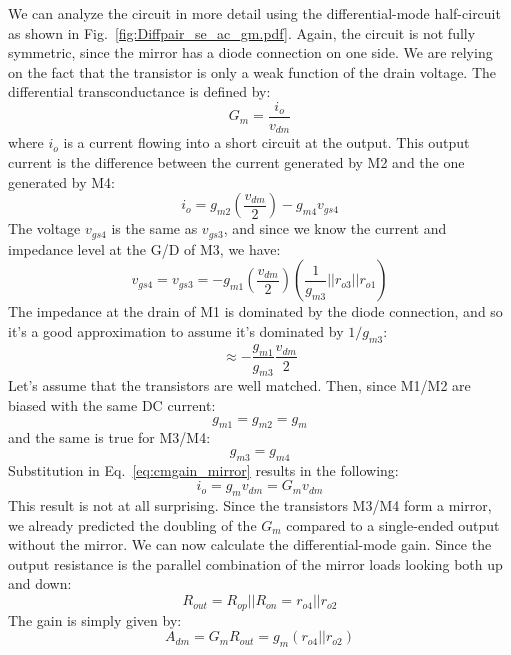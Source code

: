 We can analyze the circuit in more detail using the differential-mode half-circuit as shown in Fig.~\ref{fig:Diffpair_se_ac_gm.pdf}.  Again, the circuit is not fully symmetric, since the mirror has a diode connection on one side.  We are relying on the fact that the transistor is only a weak function of the drain voltage.  The differential transconductance is defined by:
\begin{equation}
	{G_m} = \frac{{{i_o}}}{{{v_{dm}}}}
\end{equation}
where $i_o$ is a current flowing into a short circuit at the output.  This output current is the difference between the current generated by M2 and the one generated by M4:
\begin{equation}
	{i_o} = {g_{m2}}\left( {\frac{{{v_{dm}}}}{2}} \right) - {g_{m4}}{v_{gs4}}
	\label{eq:cmgain_mirror}
\end{equation}
The voltage $v_{gs4}$ is the same as $v_{gs3}$, and since we know the current and impedance level at the G/D of M3, we have:
\begin{equation}
	{v_{gs4}} = {v_{gs3}} =  - {g_{m1}}\left( {\frac{{{v_{dm}}}}{2}} \right)
		\left( {\frac{1}{{{g_{m3}}}}||{r_{o3}}||{r_{o1}}} \right) 
\end{equation}
The impedance at the drain of M1 is dominated by the diode connection, and so it's a good approximation to assume it's dominated by $1/g_{m3}$:
\begin{equation}
		\approx  - \frac{{{g_{m1}}}}{{{g_{m3}}}}\frac{{{v_{dm}}}}{2}
\end{equation}
Let's assume that the transistors are well matched.  Then, since M1/M2 are biased with the same DC current:
\begin{equation}
	{g_{m1}} = {g_{m2}} = {g_m}
\end{equation}
and the same is true for M3/M4:
\begin{equation}
	{g_{m3}} = {g_{m4}}
\end{equation}
Substitution in Eq.~\ref{eq:cmgain_mirror} results in the following:
\begin{equation}
	{i_o} = {g_m}{v_{dm}} = G_m v_{dm}
\end{equation}
This result is not at all surprising.  Since the transistors M3/M4 form a mirror, we already predicted the doubling of the $G_m$ compared to a single-ended output without the mirror.
We can now calculate the differential-mode gain.  Since the output resistance is the parallel combination of the mirror loads looking both up and down:
\begin{equation}
	{R_{out}} = {R_{op}}||{R_{on}} = {r_{o4}}||{r_{o2}}
\end{equation}
The gain is simply given by:
\begin{equation}
	{A_{dm}} = {G_m}{R_{out}} = {g_m}\left( {{r_{o4}}||{r_{o2}}} \right)
\end{equation}
